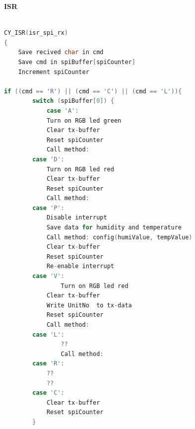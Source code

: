 \textbf{ISR}

\begin{lstlisting}[language=C]

CY_ISR(isr_spi_rx)
{
	Save recived char in cmd
	Save cmd in spiBuffer[spiCounter]
	Increment spiCounter

if ((cmd == 'R') || (cmd == 'C') || (cmd == 'L')){
    	switch (spiBuffer[0]) {
    		case 'A':
			Turn on RGB led green
			Clear tx-buffer 
			Reset spiCounter 
			Call method:                
		case 'D':
			Turn on RGB led red
			Clear tx-buffer 
			Reset spiCounter 
			Call method:  
		case 'P':
			Disable interrupt			
			Save data for humidity and temperature             
            Call method: config(humiValue, tempValue)
            Clear tx-buffer 
			Reset spiCounter 
            Re-enable interrupt  
		case 'V':
        		Turn on RGB led red
			Clear tx-buffer   
			Write UnitNo  to tx-data		
			Reset spiCounter 
			Call method:  
       	case 'L':
        		??
        		Call method: 
       	case 'R':
			??
			??
      	case 'C':
           	Clear tx-buffer   
           	Reset spiCounter 
    	}
\end{lstlisting}
